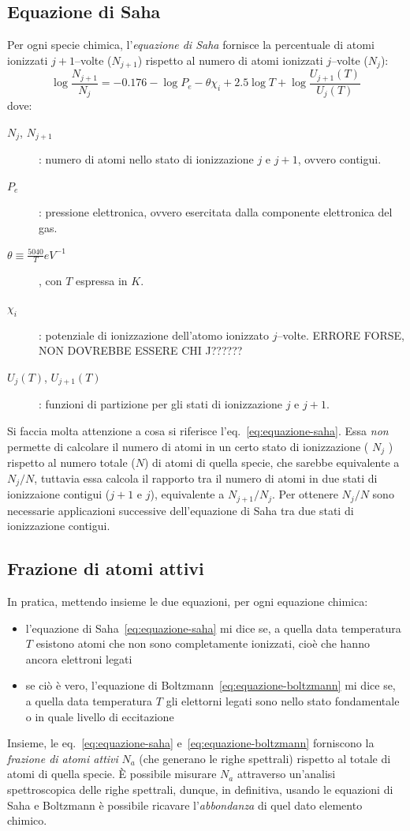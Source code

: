 \subsection{Equazione di Saha}
Per ogni specie chimica, l'\emph{equazione di Saha} fornisce la percentuale di atomi ionizzati $j+1$--volte ($N_{j+1}$) rispetto al numero di atomi ionizzati $j$--volte ($N_j$):
\begin{equation}\label{eq:equazione-saha}
    \log \dfrac{N_{j+1}}{N_j} = -0.176 - \log P_e - \theta \chi_i + 2.5 \log T + \log \dfrac{{U_{j+1}}(T)}{{U_j}(T)}
\end{equation}
dove:
\begin{description}
    \item[$N_j$, $N_{j+1}$]: numero di atomi nello stato di ionizzazione $j$ e $j+1$, ovvero contigui.
    \item[$P_e$]: pressione elettronica, ovvero esercitata dalla componente elettronica del gas.
    \item[$\theta \equiv \frac{5040}{T} \si{eV^{-1}}$], con $T$ espressa in $\si{K}$.
    \item[$\chi_i$]: potenziale di ionizzazione dell'atomo ionizzato $j$--volte. ERRORE FORSE, NON DOVREBBE ESSERE CHI J??????
    \item[${U_j}(T)$, ${U_{j+1}}(T)$]: funzioni di partizione per gli stati di ionizzazione $j$ e $j+1$.
\end{description}
Si faccia molta attenzione a cosa si riferisce l'eq.~\eqref{eq:equazione-saha}. Essa \emph{non} permette di calcolare il numero di atomi in un certo stato di ionizzazione ( $N_j$ ) rispetto al numero totale ($N$) di atomi di quella specie, che sarebbe equivalente a $N_j / N$, tuttavia essa calcola il rapporto tra il numero di atomi in due stati di ionizzaione contigui ($j+1$ e $j$), equivalente a $N_{j+1} / N_j$. Per ottenere $N_j / N$ sono necessarie applicazioni successive dell'equazione di Saha tra due stati di ionizzazione contigui.

\subsection{Frazione di atomi attivi}
In pratica, mettendo insieme le due equazioni, per ogni equazione chimica:
\begin{itemize}
    \item l'equazione di Saha~\eqref{eq:equazione-saha} mi dice se, a quella data temperatura $T$ esistono atomi che non sono completamente ionizzati, cioè che hanno ancora elettroni legati
    \item se ciò è vero, l'equazione di Boltzmann~\eqref{eq:equazione-boltzmann} mi dice se, a quella data temperatura $T$ gli elettorni legati sono nello stato fondamentale o in quale livello di eccitazione
\end{itemize}
Insieme, le eq.~\eqref{eq:equazione-saha} e~\eqref{eq:equazione-boltzmann} forniscono la \emph{frazione di atomi attivi} $N_a$ (che generano le righe spettrali) rispetto al totale di atomi di quella specie. È possibile misurare $N_a$ attraverso un'analisi spettroscopica delle righe spettrali, dunque, in definitiva, usando le equazioni di Saha e Boltzmann è possibile ricavare l'\emph{abbondanza} di quel dato elemento chimico. 

